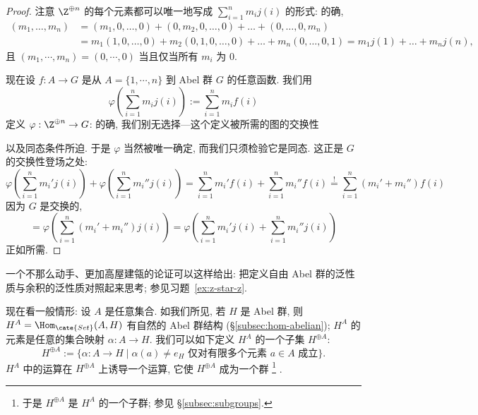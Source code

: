 \begin{proof}
注意 $\Z^{\oplus n}$ 的每个元素都可以唯一地写成 $\sum_{i=1}^{n} m_i j(i)$ 的形式: 的确,
\begin{align*}
(m_1, \dots, m_n) &= (m_1, 0, \dots, 0) + (0, m_2, 0, \dots, 0) + \dots + (0, \dots, 0, m_n) \\
&= m_1(1, 0, \dots, 0) + m_2(0, 1, 0, \dots, 0) + \dots + m_n(0, \dots, 0, 1) = m_1 j(1) + \dots + m_n j(n),
\end{align*}
且 $(m_1, \cdots, m_n) = (0, \cdots, 0)$ 当且仅当所有 $m_i$ 为 $0$.

现在设 $f : A \to G$ 是从 $A = \{1, \cdots, n\}$ 到 Abel 群 $G$ 的任意函数. 我们用
\[
\varphi\left(\sum_{i=1}^{n} m_i j(i)\right) := \sum_{i=1}^{n} m_i f(i)
\]
定义 $\varphi : \Z^{\oplus n} \to G$: 的确, 我们别无选择---这个定义被所需的图的交换性
\begin{center}
\end{center}
以及同态条件所迫. 于是 $\varphi$ 当然被唯一确定, 而我们只须检验它是同态. 这正是 $G$ 的交换性登场之处:
\[
\varphi\left(\sum_{i=1}^{n} m_i' j(i)\right) + \varphi\left(\sum_{i=1}^{n} m_i'' j(i)\right) = \sum_{i=1}^{n} m_i' f(i) + \sum_{i=1}^{n} m_i'' f(i) \overset{!}{=} \sum_{i=1}^{n} (m_i' + m_i'') f(i)
\]
因为 $G$ 是交换的,
\[
= \varphi\left(\sum_{i=1}^{n} (m_i' + m_i'') j(i)\right) = \varphi\left(\sum_{i=1}^{n} m_i' j(i) + \sum_{i=1}^{n} m_i'' j(i)\right)
\]
正如所需.
\end{proof}

\begin{remark}
\label{rem:free-abelian-highbrow}
一个不那么动手、更加高屋建瓴的论证可以这样给出: 把定义自由 Abel 群的泛性质与余积的泛性质对照起来思考; 参见习题~\ref{ex:z-star-z}.
\end{remark}

现在看一般情形: 设 $A$ 是任意集合. 如我们所见, 若 $H$ 是 Abel 群, 则 $H^A = \Hom_{\cate{Set}}(A, H)$ 有自然的 Abel 群结构 (\S\ref{subsec:hom-abelian}); $H^A$ 的元素是任意的集合映射 $\alpha : A \to H$. 我们可以如下定义 $H^A$ 的一个子集 $H^{\oplus A}$:
\[
H^{\oplus A} := \{\alpha : A \to H \mid \alpha(a) \neq e_H \text{ 仅对有限多个元素 } a \in A \text{ 成立}\}.
\]
$H^A$ 中的运算在 $H^{\oplus A}$ 上诱导一个运算, 它使 $H^{\oplus A}$ 成为一个群%
\footnote{于是 $H^{\oplus A}$ 是 $H^A$ 的一个子群; 参见 \S\ref{subsec:subgroups}.}%
.

